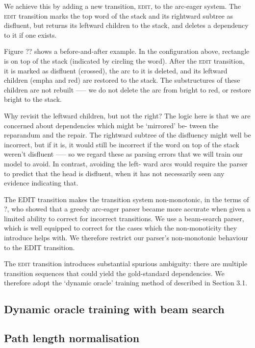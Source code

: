 \documentclass[11pt,letterpaper]{article}
\newcommand{\edittrans}{\textsc{edit}\xspace}
\begin{document}
We achieve this by adding a new transition, \edittrans, to the arc-eager system.
The \edittrans transition marks the top word of the stack and its rightward subtree
as disfluent, but returns its leftward children to the stack, and deletes a
dependency to it if one exists.

Figure ?? shows a before-and-after example. In the configuration above, rectangle
is on top of the stack (indicated by circling the word). After the \textsc{edit}
transition, it is marked as disfluent (crossed), the arc to it is deleted, and its
leftward children (empha and red) are restored to the stack. The substructures
of these children are not rebuilt —-- we do not delete the arc from bright to red,
or restore bright to the stack.

Why revisit the leftward children, but not the right? The logic here is that we are
concerned about dependencies which might be ‘mirrored’ be- tween the reparandum
and the repair. The rightward subtree of the disfluency might well be incorrect,
but if it is, it would still be incorrect if the word on top of the stack weren’t
disfluent —-- so we regard these as parsing errors that we will train our model
to avoid. In contrast, avoiding the left- ward arcs would require the parser to
predict that the head is disfluent, when it has not necessarily seen any evidence
indicating that.

The EDIT transition makes the transition system non-monotonic, in the terms of ?,
who showed that a greedy arc-eager parser became more accurate when given a limited
ability to correct for incorrect transitions. We use a beam-search parser, which
is well equipped to correct for the cases which the non-monoticity they introduce
helps with. We therefore restrict our parser’s non-monotonic behaviour to the
EDIT transition.

The \edittrans transition introduces substantial spurious ambiguity: there are multiple
transition sequences that could yield the gold-standard dependencies. We therefore
adopt the `dynamic oracle' training method of \citet{goldberg:12} described in
Section 3.1.

\subsection{Dynamic oracle training with beam search}

\subsection{Path length normalisation}
\end{document}
